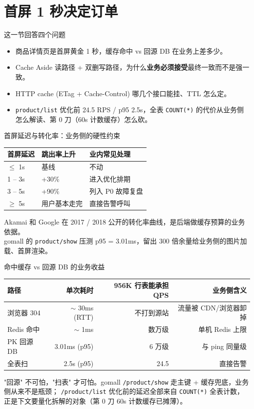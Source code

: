 \documentclass[aspectratio=169,11pt]{beamer}
\begin{document}
\section{首屏 1 秒决定订单}

\begin{frame}[shrink]{这一节回答四个问题}
\begin{itemize}
  \item 商品详情页是首屏黄金 1 秒，缓存命中 vs 回源 DB 在业务上差多少。
  \item Cache Aside 读路径 + 双删写路径，为什么\textbf{业务必须接受}最终一致而不是强一致。
  \item HTTP cache (ETag + Cache-Control) 哪几个接口能挂、TTL 怎么定。
  \item \texttt{product/list} 优化前 24.5 RPS / p95 2.5s，全表 \texttt{COUNT(*)} 的代价从业务侧怎么解读、第 0 刀（60s 计数缓存）怎么砍。
\end{itemize}
\end{frame}

\begin{frame}[shrink]{首屏延迟与转化率：业务侧的硬性约束}
\begin{tabular}{@{}lll@{}}
\toprule
首屏延迟 & 跳出率上升 & 业内常见处理 \\
\midrule
$\le$ 1s   & 基线        & 不动 \\
1 -- 3s    & +30\%       & 进入优化排期 \\
3 -- 5s    & +90\%       & 列入 P0 故障复盘 \\
$\ge$ 5s   & 用户基本走完  & 直接告警呼叫 \\
\bottomrule
\end{tabular}
\vspace{3mm}
\small Akamai 和 Google 在 2017 / 2018 公开的转化率曲线，是后端做缓存预算的业务依据。\\
gomall 的 \texttt{product/show} 压测 p95 = 3.01ms，留出 300 倍余量给业务侧的图片加载、首屏渲染。
\end{frame}

\begin{frame}[shrink]{命中缓存 vs 回源 DB 的业务收益}
\begin{tabular}{@{}lrrr@{}}
\toprule
路径 & 单次耗时 & 956K 行表能承担 QPS & 业务侧含义 \\
\midrule
浏览器 304 & $\sim$ 30ms (RTT)  & 不打到源站 & 流量被 CDN/浏览器卸掉 \\
Redis 命中 & $\sim$ 1ms          & 数万级    & 单机 Redis 上限 \\
PK 回源 DB & 3.01ms (p95)        & 6 万级    & 与 ping 同量级 \\
全表扫     & 2.5s   (p95)        & 24.5      & 直接告警 \\
\bottomrule
\end{tabular}
\vspace{2mm}
\small "回源" 不可怕，"扫表" 才可怕。gomall \texttt{/product/show} 走主键 + 缓存兜底，业务侧从来不是瓶颈；
\texttt{/product/list} 优化前的延迟全部来自 \texttt{COUNT(*)} 全表计数，正是下文要量化拆解的对象（第 0 刀 60s 计数缓存已摊薄）。
\end{frame}
\end{document}
